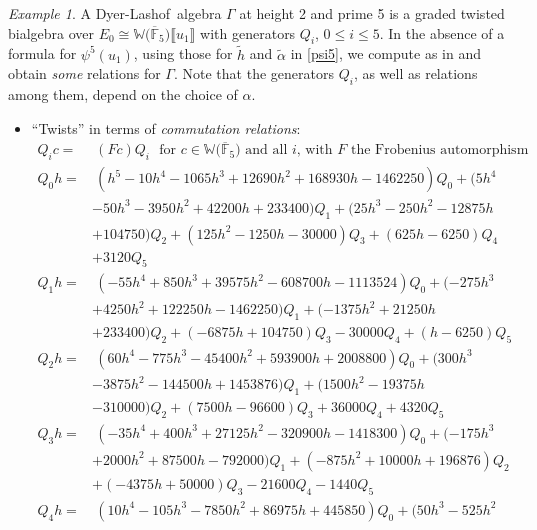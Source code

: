 \documentclass{gtpart}
\theoremstyle{definition}
\theoremstyle{remark}
\newtheorem{ex}[equation]{Example}
\newcommand{\mb}[1]{\mathbb{#1}}
\newcommand{\cF}{\overline {\mb F}}
\newcommand{\DL}{Dyer-Lashof~}
\newcommand{\BW}{{\mb W}}
\newcommand{\A}{\alpha}
\newcommand{\G}{\Gamma}
\newcommand{\lb}{\llbracket}
\newcommand{\rb}{\rrbracket}
\renewcommand{\=}{\approx}
\renewcommand{\-}{\sim}
\numberwithin{equation}{section}
\begin{document}
\begin{ex}
 \label{ex:gamma}
 A \DL algebra $\G$ at height 2 and prime 5 is a graded twisted bialgebra over 
 $E_0 \cong \BW \big( \cF_5 \big) \lb u_1 \rb$ with generators $Q_i$, 
 $0 \leq i \leq 5$.  In the absence of a formula for $\psi^5(u_1)$, using those 
 for $\widetilde{h}$ and $\widetilde{\A}$ in \eqref{psi5}, we compute as in 
 \cite[Proposition 3.6]{p3} and obtain {\em some} relations for $\G$.  Note that 
 the generators $Q_i$, as well as relations among them, depend on the choice of 
 $\A$.  

 \begin{itemize}
  \item ``Twists'' in terms of {\em commutation relations}: 
  \begin{equation*}
   \begin{split}
    Q_i c = & ~ (F c) Q_i ~~~ \text{for $c \in \BW \big( \cF_5 \big)$ and all 
              $i$, with $F$ the Frobenius automorphism} ~~ \\
    Q_0 h = & ~ (h^5 - 10 h^4 - 1065 h^3 + 12690 h^2 + 168930 h - 1462250) Q_0 + (5 h^4 \\
            & - 50 h^3 - 3950 h^2 + 42200 h + 233400) Q_1 + (25 h^3 - 250 h^2 - 12875 h \\
            & + 104750) Q_2 + (125 h^2 - 1250 h - 30000) Q_3 + (625 h - 6250) Q_4 \\
            & + 3120 Q_5 \\
    Q_1 h = & ~ (-55 h^4 + 850 h^3 + 39575 h^2 - 608700 h - 1113524) Q_0 + (-275 h^3 \\
            & + 4250 h^2 + 122250 h - 1462250) Q_1 + (-1375 h^2 + 21250 h \\
            & + 233400) Q_2 + (-6875 h + 104750) Q_3 - 30000 Q_4 + (h - 6250) Q_5 \\
    Q_2 h = & ~ (60 h^4 - 775 h^3 - 45400 h^2 + 593900 h + 2008800) Q_0 + (300 h^3 \\
            & - 3875 h^2 - 144500 h + 1453876) Q_1 + (1500 h^2 - 19375 h \\
            & - 310000) Q_2 + (7500 h - 96600) Q_3 + 36000 Q_4 + 4320 Q_5 \\
    Q_3 h = & ~ (-35 h^4 + 400 h^3 + 27125 h^2 - 320900 h - 1418300) Q_0 + (-175 h^3 \\
            & + 2000 h^2 + 87500 h - 792000) Q_1 + (-875 h^2 + 10000 h + 196876) Q_2 \\
            & + (-4375 h + 50000) Q_3 - 21600 Q_4 - 1440 Q_5 \\
    Q_4 h = & ~ (10 h^4 - 105 h^3 - 7850 h^2 + 86975 h + 445850) Q_0 + (50 h^3 - 525 h^2 \\

\end{split}
\end{equation*}
\end{itemize}
\end{ex}
\end{document}
